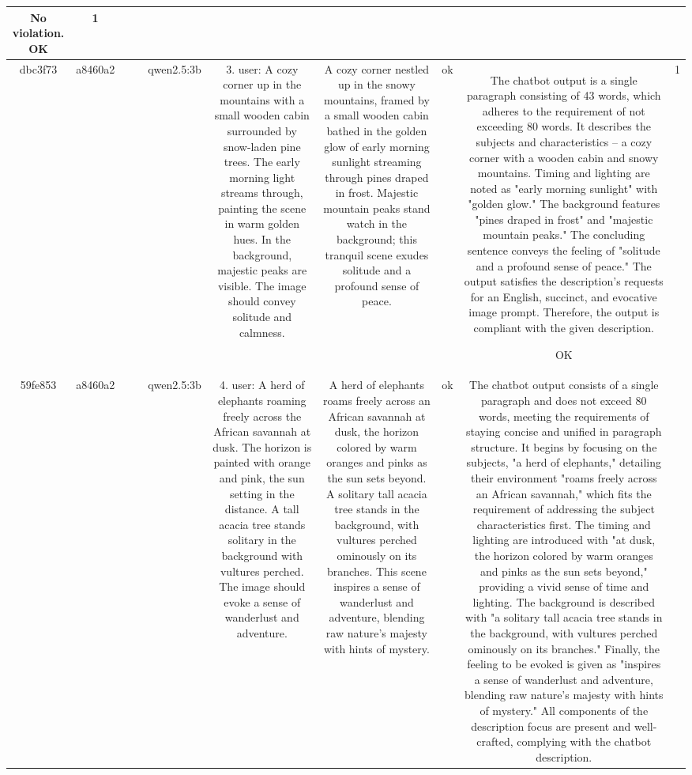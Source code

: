 \begin{table}[h!]
\begin{tabular}{|c|c|c|c|c|c|c|c|c|c|}
No violation.
OK & 1\\
\hline
dbc3f73 & a8460a2 &  &  & qwen2.5:3b & 3. user: A cozy corner up in the mountains with a small wooden cabin surrounded by snow-laden pine trees. The early morning light streams through, painting the scene in warm golden hues. In the background, majestic peaks are visible. The image should convey solitude and calmness. & A cozy corner nestled up in the snowy mountains, framed by a small wooden cabin bathed in the golden glow of early morning sunlight streaming through pines draped in frost. Majestic mountain peaks stand watch in the background; this tranquil scene exudes solitude and a profound sense of peace. & ok & The chatbot output is a single paragraph consisting of 43 words, which adheres to the requirement of not exceeding 80 words. It describes the subjects and characteristics – a cozy corner with a wooden cabin and snowy mountains. Timing and lighting are noted as "early morning sunlight" with "golden glow." The background features "pines draped in frost" and "majestic mountain peaks." The concluding sentence conveys the feeling of "solitude and a profound sense of peace." The output satisfies the description's requests for an English, succinct, and evocative image prompt. Therefore, the output is compliant with the given description.

OK & 1\\
\hline
59fe853 & a8460a2 &  &  & qwen2.5:3b & 4. user: A herd of elephants roaming freely across the African savannah at dusk. The horizon is painted with orange and pink, the sun setting in the distance. A tall acacia tree stands solitary in the background with vultures perched. The image should evoke a sense of wanderlust and adventure. & A herd of elephants roams freely across an African savannah at dusk, the horizon colored by warm oranges and pinks as the sun sets beyond. A solitary tall acacia tree stands in the background, with vultures perched ominously on its branches. This scene inspires a sense of wanderlust and adventure, blending raw nature's majesty with hints of mystery. & ok & The chatbot output consists of a single paragraph and does not exceed 80 words, meeting the requirements of staying concise and unified in paragraph structure. It begins by focusing on the subjects, "a herd of elephants," detailing their environment "roams freely across an African savannah," which fits the requirement of addressing the subject characteristics first. The timing and lighting are introduced with "at dusk, the horizon colored by warm oranges and pinks as the sun sets beyond," providing a vivid sense of time and lighting. The background is described with "a solitary tall acacia tree stands in the background, with vultures perched ominously on its branches." Finally, the feeling to be evoked is given as "inspires a sense of wanderlust and adventure, blending raw nature's majesty with hints of mystery." All components of the description focus are present and well-crafted, complying with the chatbot description.


\end{tabular}
\end{table}

